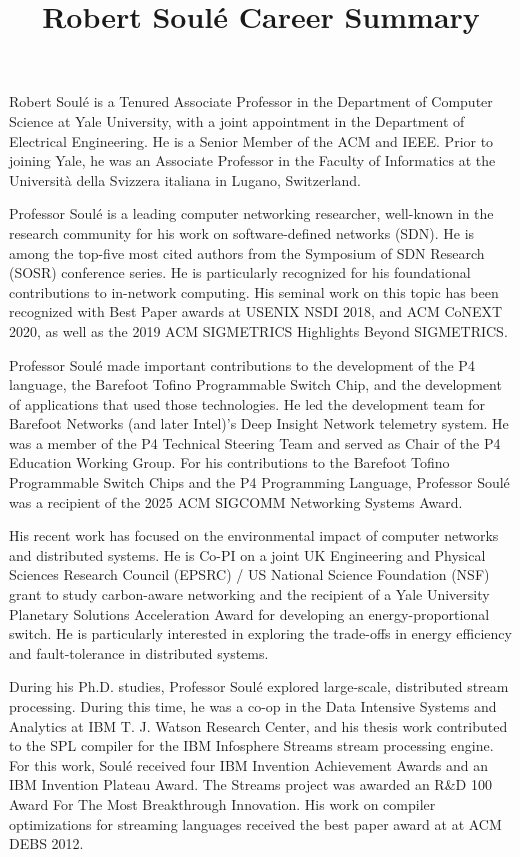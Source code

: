 \documentclass[11pt]{article}
\title{ Robert Soul\'{e} Career Summary}
\author{  }
\date{ }
\begin{document}
\maketitle	
\thispagestyle{empty}


Robert Soul\'{e} is a Tenured Associate Professor in the Department of
Computer Science at Yale University, with a joint appointment in the
Department of Electrical Engineering. He is a Senior Member of the ACM
and IEEE.  Prior to joining Yale, he was an Associate Professor in the
Faculty of Informatics at the Universit\`{a} della Svizzera italiana
in Lugano, Switzerland.

Professor Soul\'{e} is a leading computer networking researcher,
well-known in the research community for his work on software-defined
networks (SDN). He is among the top-five most cited authors from the
Symposium of SDN Research (SOSR) conference series. He is particularly
recognized for his foundational contributions to in-network
computing. His seminal work on this topic has been recognized with
Best Paper awards at USENIX NSDI 2018, and ACM CoNEXT 2020, as well as
the 2019 ACM SIGMETRICS Highlights Beyond SIGMETRICS.


Professor Soul\'{e} made important contributions to the development of
the P4 language, the Barefoot Tofino Programmable Switch Chip, and the
development of applications that used those technologies. He led the
development team for Barefoot Networks (and later Intel)'s Deep
Insight Network telemetry system. He was a member of the P4 Technical
Steering Team and served as Chair of the P4 Education Working
Group. For his contributions to the Barefoot Tofino Programmable
Switch Chips and the P4 Programming Language, Professor Soul\'{e} was
a recipient of the 2025 ACM SIGCOMM Networking Systems Award.

His recent work has focused on the environmental impact of computer
networks and distributed systems. He is Co-PI on a joint UK
Engineering and Physical Sciences Research Council (EPSRC) / US
National Science Foundation (NSF) grant to study carbon-aware
networking and the recipient of a Yale University Planetary Solutions
Acceleration Award for developing an energy-proportional switch. He is
particularly interested in exploring the trade-offs in energy
efficiency and fault-tolerance in distributed systems.

During his Ph.D. studies, Professor Soul\'{e} explored large-scale,
distributed stream processing. During this time, he was a co-op in the
Data Intensive Systems and Analytics at IBM T. J. Watson Research
Center, and his thesis work contributed to the SPL compiler for the
IBM Infosphere Streams stream processing engine. For this work,
Soul\'{e} received four IBM Invention Achievement Awards and an IBM
Invention Plateau Award. The Streams project was awarded an R\&D 100
Award For The Most Breakthrough Innovation.  His work on compiler
optimizations for streaming languages received the best paper award at
at ACM DEBS 2012.
\end{document}
